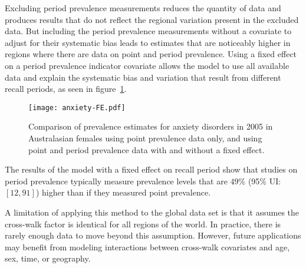Excluding period prevalence measurements reduces the quantity of data
and produces results that do not reflect the regional variation
present in the excluded data.  But including the period prevalence
measurements without a covariate to adjust for their systematic bias
leads to estimates that are noticeably higher in regions where there
are data on point and period prevalence.  Using a fixed effect on a
period prevalence indicator covariate allows the model to use all
available data and explain the systematic bias and variation that
result from different recall periods, as seen in
figure~\ref{fig:app-anxiety FE}.

    \begin{figure}[h]
        \begin{center}
            \texttt{[image: anxiety-FE.pdf]}
            \caption{Comparison of prevalence estimates for anxiety
              disorders in 2005 in Australasian females using point
              prevalence data only, and using point and period prevalence data
              with and without a fixed effect.}
            \label{fig:app-anxiety FE}
        \end{center}
    \end{figure}

The results of the model with a fixed effect on recall period show
that studies on period prevalence typically measure prevalence levels
that are $49$\% (95\% UI: $[12, 91]$) higher than if they measured point
prevalence.

A limitation of applying this method to the global data set is that it
assumes the cross-walk factor is identical for all regions of the
world.  In practice, there is rarely enough data to move beyond this
assumption.  However, future applications may benefit from modeling
interactions between cross-walk covariates and age, sex, time, or
geography.
